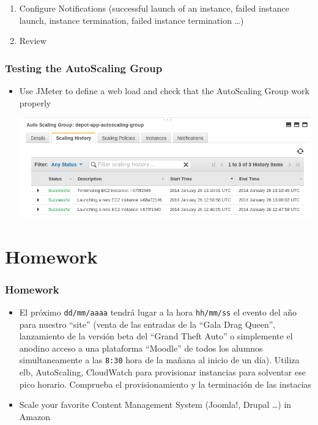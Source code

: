 \documentclass{beamer}
\begin{document}
\begin{frame}
\begin{enumerate}
\begin{center}
\end{center}
\item Configure Notifications (successful launch of an instance, failed instance launch, instance termination, failed instance termination \dots)
\item Review
\end{enumerate}
\end{frame}
\begin{frame}[fragile]
\frametitle{Testing the AutoScaling Group}

\lstset{language=shell}
\begin{itemize}
 \item Use JMeter to define a web load and check that the AutoScaling Group work properly
\begin{center}
\includegraphics[scale=0.45]{autoscalingwork.png}
\end{center}
\end{itemize}

\end{frame}

\section{Homework}
\begin{frame}[fragile]
\frametitle{Homework}
\begin{itemize}
\item El próximo \texttt{dd/mm/aaaa} tendrá lugar a la hora \texttt{hh/mm/ss} el evento del año para nuestro ``site'' (venta de las entradas de la
``Gala Drag Queen'', lanzamiento de la versión beta del ``Grand Theft Auto'' o simplemente el anodino acceso a una plataforma ``Moodle'' de todos los alumnos simultaneamente a las \texttt{8:30} hora de la mañana al inicio de un día). 
Utiliza \acrshort{elb}, AutoScaling, CloudWatch para provisionar instancias para solventar ese pico horario. Comprueba el provisionamiento y la terminación de las instacias

\item Scale your favorite Content Management System (Joomla!, Drupal \dots) in Amazon
\end{itemize}
\end{frame}
\end{document}
